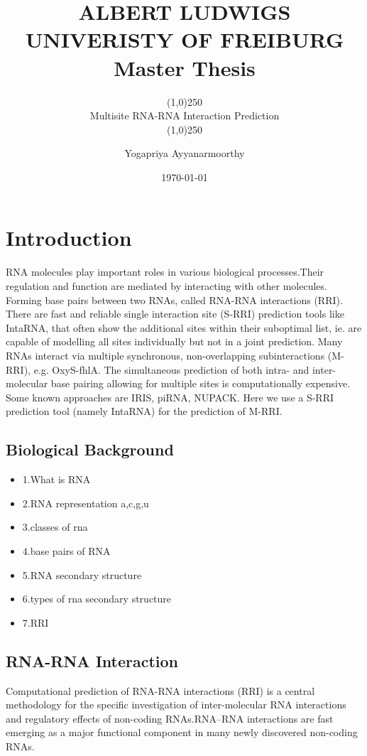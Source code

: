 \documentclass[twoside,a4paper]{report}
\title{ALBERT LUDWIGS UNIVERISTY OF FREIBURG
		\\{\Large Master Thesis}}
\subtitle{\line(1,0){250}\\{\Huge Multisite RNA-RNA Interaction Prediction}\\\line(1,0){250}}
\author{Yogapriya Ayyanarmoorthy}
\date{\today}
\begin{document}
	
	\maketitle
	
	\tableofcontents
	
	\chapter{Introduction}
	RNA molecules play important roles in various biological processes.Their regulation and function are mediated by interacting with other molecules. 	Forming base pairs between two RNAs, called RNA-RNA interactions (RRI). There are fast and reliable single interaction site (S-RRI) prediction tools like IntaRNA, that often show the additional sites within their suboptimal list, ie. are capable of modelling all sites individually but not in a joint prediction. Many RNAs interact via multiple synchronous, non-overlapping subinteractions (M-RRI), e.g. OxyS-fhlA. The simultaneous prediction of both intra- and inter-molecular base pairing allowing for multiple sites is computationally expensive. Some known approaches are IRIS, piRNA, NUPACK. Here we use a S-RRI prediction tool (namely IntaRNA) for the prediction of M-RRI.
	
	\section{Biological Background}
	\begin{itemize}
	 	\item 1.What is RNA
	 	\item 2.RNA representation {a,c,g,u}
	 	\item 3.classes of rna
	 	\item 4.base pairs of RNA
	 	\item 5.RNA secondary structure
	 	\item 6.types of rna secondary structure
	 	\item 7.RRI 
	\end{itemize}
	
	\section{RNA-RNA Interaction}
 	Computational prediction of RNA-RNA interactions (RRI) is a central methodology for the specific investigation of inter-molecular RNA interactions and regulatory effects of non-coding RNAs.RNA–RNA interactions are fast emerging as a major functional component in many newly discovered non-coding RNAs.\\
 	
\end{document}
